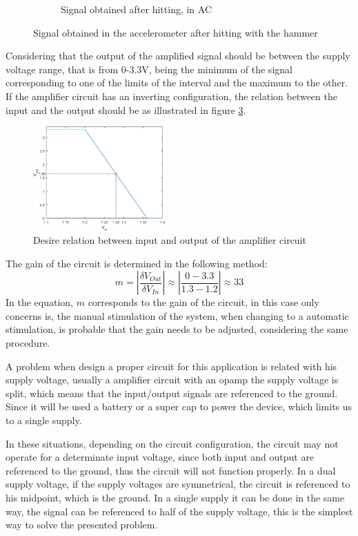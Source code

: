 \begin{figure}[]
\begin{subfigure}{0.45\textwidth}
        \caption{Signal obtained after hitting, in AC}{}
        \label{subfig:maxAccN}
    \end{subfigure}
    \caption{Signal obtained in the accelerometer after hitting with the hammer}
    \label{fig:NampSigAcc}
\end{figure}
Considering that the output of the amplified signal should be between the supply voltage range, that is from 0-3.3V, being the minimum of the signal corresponding to one of the limits of the interval and the maximum to the other. If the amplifier circuit has an inverting configuration, the relation between the input and the output should be as illustrated in figure \ref{fig:inVSout}.
\begin{figure}[]
    \centering
    \includegraphics[width=0.45\textwidth]{Chapters/4CHP/Figures/inOut.eps}
    \caption{Desire relation between input and output of the amplifier circuit}
    \label{fig:inVSout}
\end{figure}
The gain of the circuit is determined in the following method:
\begin{equation*}
   m = |\frac{\delta V_{Out}}{\delta V_{In}}| \approx |\frac{0-3.3}{1.3-1.2}| \approx 33
\end{equation*}
In the equation, $m$ corresponds to the gain of the circuit, in this case only concerns is, the manual stimulation of the system, when changing to a automatic stimulation, is probable that the gain needs to be adjusted, considering the same procedure.

A problem when design a proper circuit for this application is related with his supply voltage, usually a amplifier circuit with an \acrshort{opamp} the supply voltage is split, which means that the input/output signals are referenced to the ground. Since it will be used a battery or a super cap to power the device, which limits us to a single supply.

In these situations, depending on the circuit configuration, the circuit may not operate for a determinate input voltage, since both input and output are referenced to the ground, thus the circuit will not function properly. In a dual supply voltage, if the supply voltages are symmetrical, the circuit is referenced to his midpoint, which is the ground. In a single supply it can be done in the same way, the signal can be referenced to half of the supply voltage, this is the simplest way to solve the presented problem. 

